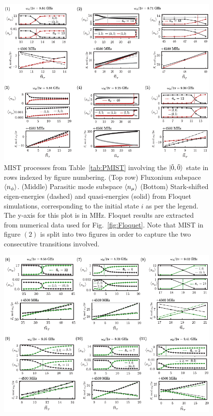 \documentclass[%
reprint,
superscriptaddress,
 amsmath,amssymb,
 aps,
 prx,
longbibliography,
floatfix,
]{revtex4-2}
\newcommand{\sh}[1]{{\color{blue}{{}[SS: #1]}}}%
\begin{document}
{%
\begin{figure}
    \centering
    \includegraphics[width=1.0\textwidth]{Supp_Fig/Trans0.pdf}
    \caption{MIST processes from Table~\ref{tab:PMIST} involving the $\ket{\tilde{0},\tilde{0}}$ state in rows indexed by figure numbering. (Top row) Fluxonium subspace $\braket{n_\phi}$. (Middle) Parasitic mode subspace $\braket{n_\mu}$ (Bottom) Stark-shifted eigen-energies (dashed) and quasi-energies (solid) from Floquet simulations, corresponding to the initial state $i$ as per the legend. The y-axis for this plot is in MHz. Floquet results are extracted from numerical data used for Fig.~\ref{fig:Floquet}. Note that MIST in figure $(2)$ is split into two figures in order to capture the two consecutive transitions involved.}
    \label{fig:Trans0}
\end{figure}
\begin{figure}
    \centering
    \includegraphics[width=1.0\textwidth]{Supp_Fig/Trans1.pdf}

\end{figure}}
\end{document}
